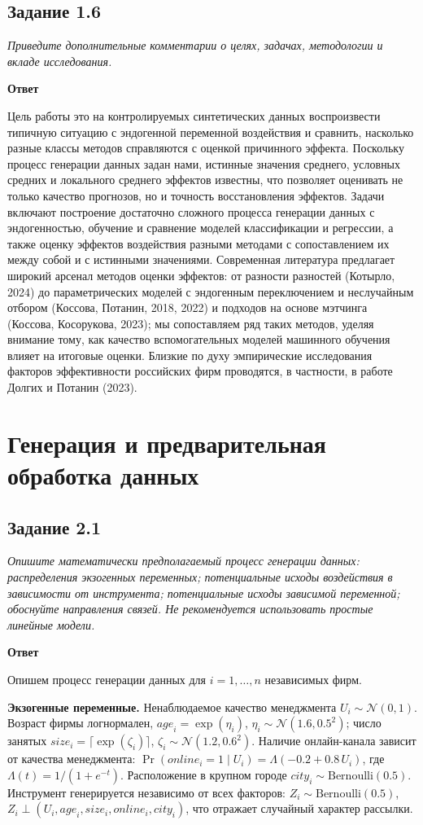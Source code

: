 \documentclass[12pt,a4paper]{article}
\newcommand{\zadanie}[2]{\subsection*{Задание #1}\begingroup\itshape #2\par\endgroup\medskip}
\newcommand{\otvet}{\par\noindent\textbf{Ответ}\par\medskip}
\begin{document}
\zadanie{1.6}{Приведите дополнительные комментарии о целях, задачах, методологии и вкладе исследования.}
\otvet
Цель работы это на контролируемых синтетических данных воспроизвести типичную ситуацию с эндогенной переменной воздействия и сравнить, насколько разные классы методов справляются с оценкой причинного эффекта. Поскольку процесс генерации данных задан нами, истинные значения среднего, условных средних и локального среднего эффектов известны, что позволяет оценивать не только качество прогнозов, но и точность восстановления эффектов. Задачи включают построение достаточно сложного процесса генерации данных с эндогенностью, обучение и сравнение моделей классификации и регрессии, а также оценку эффектов воздействия разными методами с сопоставлением их между собой и с истинными значениями. Современная литература предлагает широкий арсенал методов оценки эффектов: от разности разностей (Котырло, 2024) до параметрических моделей с эндогенным переключением и неслучайным отбором (Коссова, Потанин, 2018, 2022) и подходов на основе мэтчинга (Коссова, Косорукова, 2023); мы сопоставляем ряд таких методов, уделяя внимание тому, как качество вспомогательных моделей машинного обучения влияет на итоговые оценки. Близкие по духу эмпирические исследования факторов эффективности российских фирм проводятся, в частности, в работе Долгих и Потанин (2023).

\section{Генерация и предварительная обработка данных}

\zadanie{2.1}{Опишите математически предполагаемый процесс генерации данных: распределения экзогенных переменных; потенциальные исходы воздействия в зависимости от инструмента; потенциальные исходы зависимой переменной; обоснуйте направления связей. Не рекомендуется использовать простые линейные модели.}
\otvet
Опишем процесс генерации данных для $i=1,\dots,n$ независимых фирм.

\textbf{Экзогенные переменные.} Ненаблюдаемое качество менеджмента $U_i\sim\mathcal{N}(0,1)$. Возраст фирмы логнормален, $\textit{age}_i=\exp(\eta_i)$, $\eta_i\sim\mathcal{N}(1.6,0.5^2)$; число занятых $\textit{size}_i=\lceil\exp(\zeta_i)\rceil$, $\zeta_i\sim\mathcal{N}(1.2,0.6^2)$. Наличие онлайн-канала зависит от качества менеджмента: $\Pr(\textit{online}_i=1\mid U_i)=\Lambda(-0.2+0.8\,U_i)$, где $\Lambda(t)=1/(1+e^{-t})$. Расположение в крупном городе $\textit{city}_i\sim\mathrm{Bernoulli}(0.5)$. Инструмент генерируется независимо от всех факторов: $Z_i\sim\mathrm{Bernoulli}(0.5)$, $Z_i\perp(U_i,\textit{age}_i,\textit{size}_i,\textit{online}_i,\textit{city}_i)$, что отражает случайный характер рассылки.
\end{document}
